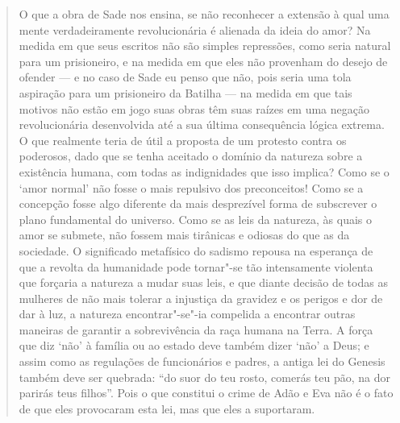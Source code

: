 \begin{quote}
O que a obra de Sade nos ensina, se não reconhecer a extensão à qual uma
mente verdadeiramente revolucionária é alienada da ideia do amor? Na
medida em que seus escritos não são simples repressões, como seria
natural para um prisioneiro, e na medida em que eles não provenham do
desejo de ofender --- e no caso de Sade eu penso que não, pois seria uma
tola aspiração para um prisioneiro da Batilha --- na medida em que tais
motivos não estão em jogo suas obras têm suas raízes em uma negação
revolucionária desenvolvida até a sua última consequência lógica
extrema. O que realmente teria de útil a proposta de um protesto contra
os poderosos, dado que se tenha aceitado o domínio da natureza sobre a
existência humana, com todas as indignidades que isso implica? Como se o
`amor normal' não fosse o mais repulsivo dos preconceitos! Como se a
concepção fosse algo diferente da mais desprezível forma de subscrever o
plano fundamental do universo. Como se as leis da natureza, às quais o
amor se submete, não fossem mais tirânicas e odiosas do que as da
sociedade. O significado metafísico do sadismo repousa na esperança de
que a revolta da humanidade pode tornar"-se tão intensamente violenta que
forçaria a natureza a mudar suas leis, e que diante decisão de todas as
mulheres de não mais tolerar a injustiça da gravidez e os perigos e dor
de dar à luz, a natureza encontrar"-se"-ia compelida a encontrar outras
maneiras de garantir a sobrevivência da raça humana na Terra. A força
que diz `não' à família ou ao estado deve também dizer `não' a Deus; e
assim como as regulações de funcionários e padres, a antiga lei do
Genesis também deve ser quebrada: ``do suor do teu rosto, comerás teu
pão, na dor parirás teus filhos''. Pois o que constitui o crime de Adão
e Eva não é o fato de que eles provocaram esta lei, mas que eles a
suportaram.
\end{quote}



